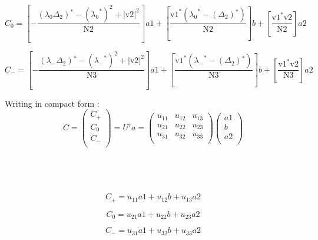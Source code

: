 \documentclass{article}
\begin{document}
\begin{equation}
    C_0= \left[  -\frac{\left(\text{$\lambda_0$} \Delta _2\right){}^*-\left(\text{$\lambda_0$}^*\right)^2+\left|\text{v2}\right|^2}{\text{N2}} \right] a1 + \left[ \frac{\text{v1}^* \left(\text{$\lambda_0$}^*-\left(\Delta _2\right){}^*\right)}{\text{N2}} \right] b + \left[\frac{\text{v1}^* \text{v2}}{\text{N2}}\right] a2
\end{equation}

\begin{equation}
    C_-= \left[  -\frac{\left(\text{$\lambda_-$} \Delta _2\right){}^*-\left(\text{$\lambda_-$}^*\right)^2+\left|\text{v2}\right|^2}{\text{N3}} \right] a1 + \left[ \frac{\text{v1}^* \left(\text{$\lambda_-$}^*-\left(\Delta _2\right){}^*\right)}{\text{N3}} \right] b + \left[\frac{\text{v1}^* \text{v2}}{\text{N3}}\right] a2
\end{equation}

Writing in compact form :
$$
C= \begin{pmatrix}
  C_+\\
  C_0 \\
  C_-
  \\
\end{pmatrix} =  U^{\dagger} a=\left(
\begin{array}{ccc}
 u_{11} & u_{12} & u_{13} \\
 u_{21} & u_{22} & u_{23} \\
 u_{31} & u_{32} & u_{33} \\
 \end{array}
\right)
\begin{pmatrix}
  a1\\
  b \\
  a2 \\
\end{pmatrix}
$$
\\
\\ \\ \\
\begin{equation}
\label{eq:C+}
    C_+= u_{11} a1 + u_{12} b + u_{13} a2
\end{equation}

\begin{equation}
    C_0= u_{21} a1 + u_{22} b + u_{23} a2
\end{equation}

\begin{equation}
\label{eq:C-}
    C_-= u_{31} a1 + u_{32} b + u_{33} a2
\end{equation}
\end{document}
